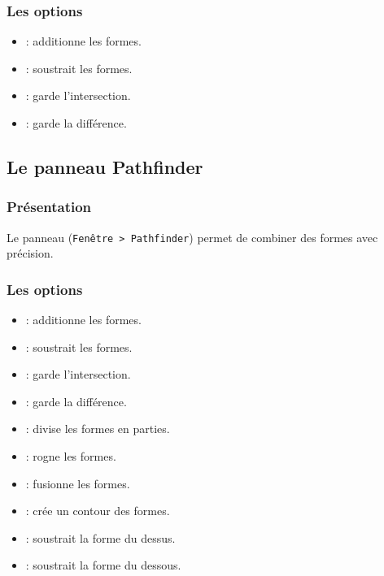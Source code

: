 \subsubsection{Les options}

\begin{itemize}
    \item {} : additionne les formes.
    \item {} : soustrait les formes.
    \item {} : garde l'intersection.
    \item {} : garde la différence.
\end{itemize}

\subsection{Le panneau Pathfinder}

\subsubsection{Présentation}

Le panneau  (\texttt{Fenêtre > Pathfinder}) permet de combiner des formes avec précision.

\subsubsection{Les options}

\begin{itemize}
    \item {} : additionne les formes.
    \item {} : soustrait les formes.
    \item {} : garde l'intersection.
    \item {} : garde la différence.
    \item {} : divise les formes en parties.
    \item {} : rogne les formes.
    \item {} : fusionne les formes.
    \item {} : crée un contour des formes.
    \item {} : soustrait la forme du dessus.
    \item {} : soustrait la forme du dessous.
\end{itemize}

